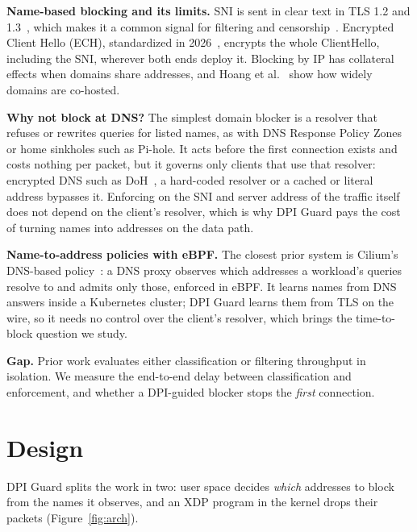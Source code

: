 \documentclass[sigconf,nonacm]{acmart}
\newcommand{\sys}{DPI Guard}
\begin{document}
\textbf{Name-based blocking and its limits.} SNI is sent in clear text in TLS 1.2 and
1.3~\cite{rfc6066,rfc8446}, which makes it a common signal for filtering and
censorship~\cite{chai}. Encrypted Client Hello (ECH), standardized in 2026~\cite{ech,svcbech},
encrypts the whole ClientHello, including the SNI, wherever both ends deploy it. Blocking by IP
has collateral effects when domains share addresses, and Hoang et al.~\cite{hoang} show how
widely domains are co-hosted.

\textbf{Why not block at DNS?} The simplest domain blocker is a resolver that refuses or
rewrites queries for listed names, as with DNS Response Policy Zones~\cite{rpz} or home
sinkholes such as Pi-hole. It acts before the first connection exists and costs nothing per
packet, but it governs only clients that use that resolver: encrypted DNS such as
DoH~\cite{doh}, a hard-coded resolver or a cached or literal address bypasses it. Enforcing on
the SNI and server address of the traffic itself does not depend on the client's resolver,
which is why \sys{} pays the cost of turning names into addresses on the data path.

\textbf{Name-to-address policies with eBPF.} The closest prior system is Cilium's DNS-based
policy~\cite{cilium}: a DNS proxy observes which addresses a workload's queries resolve to and
admits only those, enforced in eBPF. It learns names from DNS answers inside a Kubernetes
cluster; \sys{} learns them from TLS on the wire, so it needs no control over the client's
resolver, which brings the time-to-block question we study.

\textbf{Gap.} Prior work evaluates either classification or filtering throughput in isolation.
We measure the end-to-end delay between classification and enforcement, and whether a
DPI-guided blocker stops the \emph{first} connection.

\section{Design}
\label{sec:design}

\sys{} splits the work in two: user space decides \emph{which} addresses to block from the
names it observes, and an XDP program in the kernel drops their packets
(Figure~\ref{fig:arch}).
\end{document}
